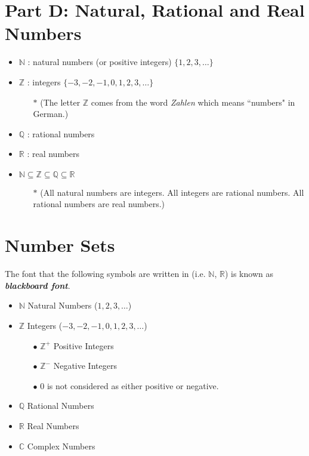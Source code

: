 \documentclass[11pt,a4paper,titlepage,oneside,openany]{article}
\numberwithin{equation}{section}
\numberwithin{algorithm}{section}
\numberwithin{figure}{section}
\numberwithin{table}{section}
\newcommand{\mb}{\mathbb}
\begin{document}
\section*{Part D: Natural, Rational and Real Numbers}
\begin{framed}
	\begin{itemize}
		\item $\mb{N}$ : natural numbers (or positive integers) $\{1,2,3,\ldots\}$
		\item $\mb{Z}$ : integers $\{-3,-2,-1,0,1,2,3,\ldots\}$
		\begin{itemize}
			\item[$\ast$] (The letter $\mb{Z}$ comes from the word \emph{Zahlen} which means ``numbers" in German.)
		\end{itemize}
		\item $\mb{Q}$ : rational numbers
		\item $\mb{R}$ : real numbers
		\item $\mb{N} \subseteq \mb{Z } \subseteq \mb{Q} \subseteq \mb{R}$
		\begin{itemize}
			\item[$\ast$] (All natural numbers are integers. All integers are rational numbers. All rational numbers are real numbers.)
		\end{itemize}
	\end{itemize}
\end{framed}

\section*{Number Sets}
The font that the following symbols are written in (i.e. $\mathbb{N}$, $\mathbb{R}$) is known as \textit{\textbf{blackboard font}}.
\begin{itemize}
	\item $\mathbb{N}$ Natural Numbers ($1,2,3,\ldots$) 
	\item $\mathbb{Z}$ Integers ($-3,-2,-1,0,1,2,3, \ldots$)
	\begin{itemize}
		\item[$\bullet$] $\mathbb{Z}^{+}$ Positive Integers
		\item[$\bullet$] $\mathbb{Z}^{-}$ Negative Integers
		\item[$\bullet$] 0 is not considered as either positive or negative.
	\end{itemize}
	\item $\mathbb{Q}$ Rational Numbers
	\item $\mathbb{R}$ Real Numbers
	\item $\mathbb{C}$ Complex Numbers
\end{itemize}
\end{document}
